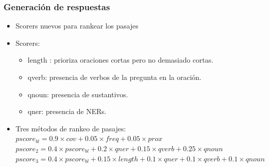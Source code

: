 \begin{frame}
\frametitle{Generación de respuestas}
  \begin{itemize}
    \item Scorers nuevos para rankear los pasajes
    \item Scorers:
    \begin{itemize}
      \item length : prioriza oraciones cortas pero no demasiado cortas.
      \item qverb: presencia de verbos de la pregunta en la oración.
      \item qnoun: presencia de sustantivos.
      \item qner: presencia de NERs.
      \end{itemize}
      \item Tres métodos de rankeo de pasajes: \newline
        \scriptsize{$pscore_{bl} = 0.9 \times cov + 0.05 \times freq + 0.05 \times prox$ \newline
        $pscore_2 = 0.4 \times pscore_{bl} + 0.2 \times qner +  0.15 \times qverb + 0.25 \times qnoun$ \newline
        $pscore_3 =  0.4 \times pscore_{bl} + 0.15 \times length + 0.1 \times qner + 0.1 \times qverb + 0.1 \times qnoun$}
  \end{itemize}
\end{frame}








